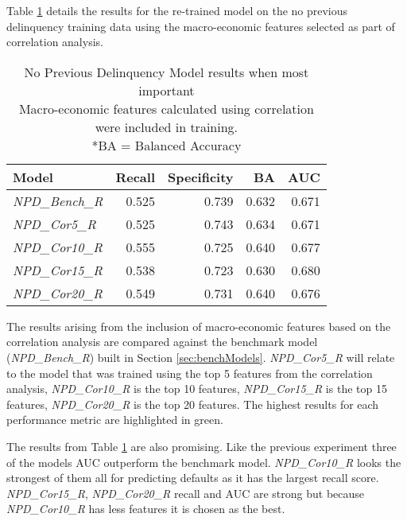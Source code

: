 Table \ref{table:NPDCorrModelResults} details the results for the
re-trained model on the no previous delinquency training data using the macro-economic features selected as part of correlation analysis.
\begin{table}[H]
	\centering
	\small
	\begin{tabular}{l r r r r}
		\hline
		\textbf{Model} & \textbf{Recall} & \textbf{Specificity} & \textbf{BA} & \textbf{AUC}  \\ \hline
		\textit{NPD\_Bench\_R} & 0.525 & 0.739 & 0.632 & 0.671   \\ \hline
		\textit{NPD\_Cor5\_R}  & 0.525 & \cellcolor{green!25}0.743 & 0.634 & 0.671   \\ 
		\textit{NPD\_Cor10\_R} & \cellcolor{green!25}0.555 & 0.725 & \cellcolor{green!25}0.640 & 0.677  \\ 
		\textit{NPD\_Cor15\_R} & 0.538 & 0.723 & 0.630 & \cellcolor{green!25}0.680  \\
		\textit{NPD\_Cor20\_R} & 0.549 & 0.731 & \cellcolor{green!25}0.640 & 0.676  \\\hline 
	\end{tabular}
	\caption{No Previous Delinquency Model results when most important \\Macro-economic features calculated using correlation were included in training.\\
		*BA = Balanced Accuracy}
	\label{table:NPDCorrModelResults}
\end{table}

The results arising from the inclusion of macro-economic features based on the correlation analysis are compared against the benchmark model (\textit{NPD\_Bench\_R}) built in Section \ref{sec:benchModels}. \textit{NPD\_Cor5\_R} will relate to the model that was trained using the top 5 features from the correlation analysis, \textit{NPD\_Cor10\_R} is the top 10 features, \textit{NPD\_Cor15\_R} is the top 15 features, \textit{NPD\_Cor20\_R} is the top 20 features. The highest results for each performance metric are highlighted in green.

The results from Table \ref{table:NPDCorrModelResults} are also
promising. Like the previous experiment three of the models AUC outperform the benchmark model. \textit{NPD\_Cor10\_R} looks the strongest of them all for predicting defaults as it has the largest recall score.  \textit{NPD\_Cor15\_R},  \textit{NPD\_Cor20\_R} recall and AUC are strong but because  \textit{NPD\_Cor10\_R} has less features it is chosen as the best.

